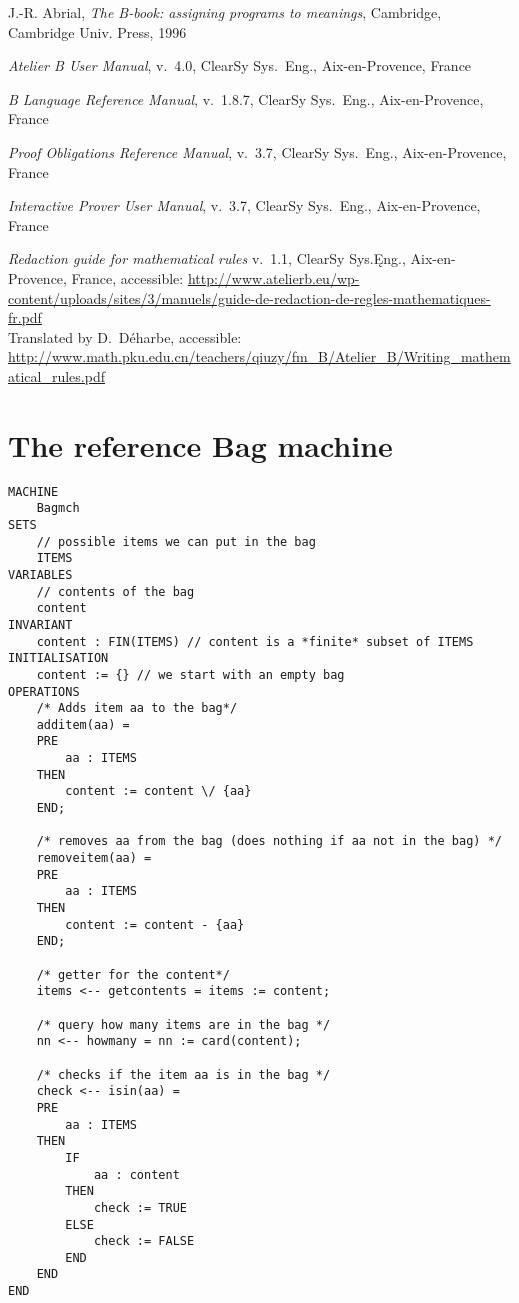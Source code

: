 \documentclass[11pt,journal]{IEEEtran}
\begin{document}
\begin{thebibliography}{2}
		J.-R. Abrial, \emph{The B-book: assigning programs to meanings}, Cambridge, Cambridge Univ. Press, 1996
		
		\emph{Atelier B User Manual}, v.~4.0, ClearSy Sys.~Eng., Aix-en-Provence, France
		
		\emph{B Language Reference Manual}, v.~1.8.7, ClearSy Sys.~Eng., Aix-en-Provence, France
		
		\emph{Proof Obligations Reference Manual}, v.~3.7, ClearSy Sys.~Eng., Aix-en-Provence, France
		
		\emph{Interactive Prover User Manual}, v.~3.7, ClearSy Sys.~Eng., Aix-en-Provence, France
		
		\emph{Redaction guide for mathematical rules} v.~1.1, ClearSy Sys.Ęng., Aix-en-Provence, France, accessible: \url{http://www.atelierb.eu/wp-content/uploads/sites/3/manuels/guide-de-redaction-de-regles-mathematiques-fr.pdf}\\
		Translated by D.~D\'{e}harbe, accessible: 
		\url{http://www.math.pku.edu.cn/teachers/qiuzy/fm_B/Atelier_B/Writing_mathematical_rules.pdf}
		

		
		
		
		

		
	\end{thebibliography}
	

	\onecolumn
	\appendices
	\section{The reference Bag machine}
	\begin{lstlisting}
MACHINE
	Bagmch
SETS
	// possible items we can put in the bag
	ITEMS
VARIABLES
	// contents of the bag
	content
INVARIANT
	content : FIN(ITEMS) // content is a *finite* subset of ITEMS
INITIALISATION
	content := {} // we start with an empty bag
OPERATIONS
	/* Adds item aa to the bag*/
	additem(aa) =
	PRE
		aa : ITEMS
	THEN
		content := content \/ {aa}
	END;

	/* removes aa from the bag (does nothing if aa not in the bag) */
	removeitem(aa) =
	PRE
		aa : ITEMS
	THEN
		content := content - {aa}
	END;

	/* getter for the content*/
	items <-- getcontents = items := content;

	/* query how many items are in the bag */
	nn <-- howmany = nn := card(content);

	/* checks if the item aa is in the bag */
	check <-- isin(aa) = 
	PRE
		aa : ITEMS
	THEN
		IF 
			aa : content
		THEN
			check := TRUE
		ELSE
			check := FALSE
		END
	END
END
\end{lstlisting}
\pagebreak
\end{document}
